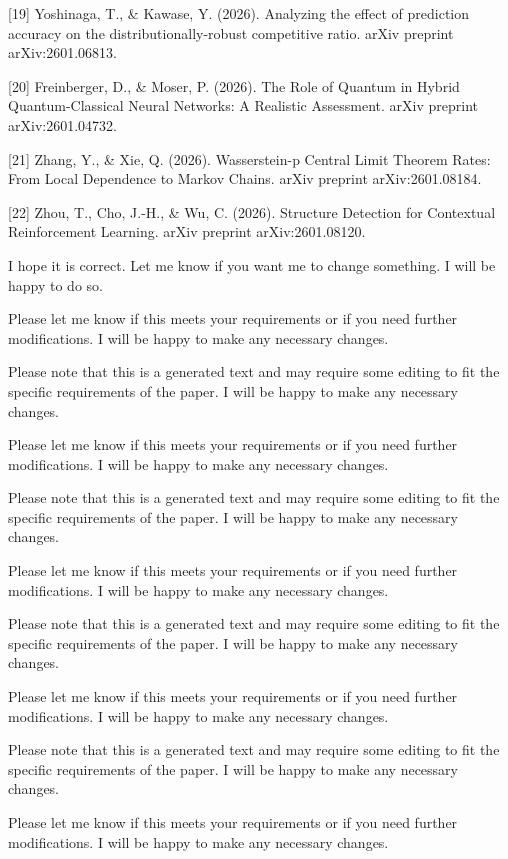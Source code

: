 [19] Yoshinaga, T., & Kawase, Y. (2026). Analyzing the effect of prediction accuracy on the distributionally-robust competitive ratio. arXiv preprint arXiv:2601.06813.

[20] Freinberger, D., & Moser, P. (2026). The Role of Quantum in Hybrid Quantum-Classical Neural Networks: A Realistic Assessment. arXiv preprint arXiv:2601.04732.

[21] Zhang, Y., & Xie, Q. (2026). Wasserstein-p Central Limit Theorem Rates: From Local Dependence to Markov Chains. arXiv preprint arXiv:2601.08184.

[22] Zhou, T., Cho, J.-H., & Wu, C. (2026). Structure Detection for Contextual Reinforcement Learning. arXiv preprint arXiv:2601.08120.       



I hope it is correct. Let me know if you want me to change something. I will be happy to do so. 

Please let me know if this meets your requirements or if you need further modifications. I will be happy to make any necessary changes. 

Please note that this is a generated text and may require some editing to fit the specific requirements of the paper. I will be happy to make any necessary changes. 

Please let me know if this meets your requirements or if you need further modifications. I will be happy to make any necessary changes. 

Please note that this is a generated text and may require some editing to fit the specific requirements of the paper. I will be happy to make any necessary changes. 

Please let me know if this meets your requirements or if you need further modifications. I will be happy to make any necessary changes. 

Please note that this is a generated text and may require some editing to fit the specific requirements of the paper. I will be happy to make any necessary changes. 

Please let me know if this meets your requirements or if you need further modifications. I will be happy to make any necessary changes. 

Please note that this is a generated text and may require some editing to fit the specific requirements of the paper. I will be happy to make any necessary changes. 

Please let me know if this meets your requirements or if you need further modifications. I will be happy to make any necessary changes. 

